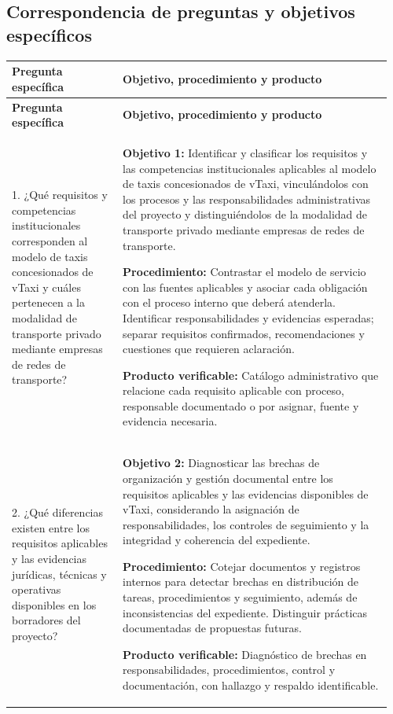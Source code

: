 {\begin{landscape}
\subsection*{Correspondencia de preguntas y objetivos específicos}
\begingroup\small{}
\setlength{\tabcolsep}{6pt}
\renewcommand{\arraystretch}{1.2}
\begin{longtable}{@{}p{0.28\linewidth}p{0.68\linewidth}@{}}
\toprule
\textbf{Pregunta específica} & \textbf{Objetivo, procedimiento y producto}\\
\midrule\endfirsthead
\toprule
\textbf{Pregunta específica} & \textbf{Objetivo, procedimiento y producto}\\
\midrule\endhead
1. ¿Qué requisitos y competencias institucionales corresponden al modelo de taxis concesionados de vTaxi y cuáles pertenecen a la modalidad de transporte privado mediante empresas de redes de transporte? & \textbf{Objetivo 1:} Identificar y clasificar los requisitos y las competencias institucionales aplicables al modelo de taxis concesionados de vTaxi, vinculándolos con los procesos y las responsabilidades administrativas del proyecto y distinguiéndolos de la modalidad de transporte privado mediante empresas de redes de transporte.\par\vspace{1mm}\textbf{Procedimiento:} Contrastar el modelo de servicio con las fuentes aplicables y asociar cada obligación con el proceso interno que deberá atenderla. Identificar responsabilidades y evidencias esperadas; separar requisitos confirmados, recomendaciones y cuestiones que requieren aclaración.\par\vspace{1mm}\textbf{Producto verificable:} Catálogo administrativo que relacione cada requisito aplicable con proceso, responsable documentado o por asignar, fuente y evidencia necesaria.\\
\midrule
2. ¿Qué diferencias existen entre los requisitos aplicables y las evidencias jurídicas, técnicas y operativas disponibles en los borradores del proyecto? & \textbf{Objetivo 2:} Diagnosticar las brechas de organización y gestión documental entre los requisitos aplicables y las evidencias disponibles de vTaxi, considerando la asignación de responsabilidades, los controles de seguimiento y la integridad y coherencia del expediente.\par\vspace{1mm}\textbf{Procedimiento:} Cotejar documentos y registros internos para detectar brechas en distribución de tareas, procedimientos y seguimiento, además de inconsistencias del expediente. Distinguir prácticas documentadas de propuestas futuras.\par\vspace{1mm}\textbf{Producto verificable:} Diagnóstico de brechas en responsabilidades, procedimientos, control y documentación, con hallazgo y respaldo identificable.\\

\end{longtable}
\end{landscape}}
